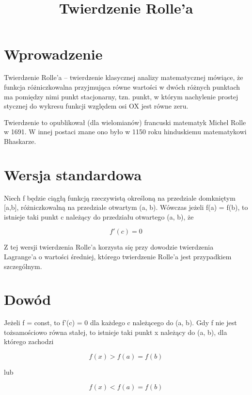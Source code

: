 \documentclass{article}
\begin{document}
\title{Twierdzenie Rolle’a}
\maketitle

\section*{Wprowadzenie}
Twierdzenie Rolle’a – twierdzenie klasycznej analizy matematycznej mówiące, że funkcja różniczkowalna przyjmująca równe wartości w dwóch różnych punktach ma pomiędzy nimi punkt stacjonarny, tzn. punkt, w którym nachylenie prostej stycznej do wykresu funkcji względem osi OX jest równe zeru.

Twierdzenie to opublikował (dla wielomianów) francuski matematyk Michel Rolle w 1691. W innej postaci znane ono było w 1150 roku hinduskiemu matematykowi Bhaskarze. 

\section*{Wersja standardowa}

Niech f będzie ciągłą funkcją rzeczywistą określoną na przedziale domkniętym [a,b], różniczkowalną na przedziale otwartym (a, b). Wówczas jeżeli f(a) = f(b), to istnieje taki punkt c należący do przedziału otwartego (a, b), że 

\begin{equation}
	f'(c)=0
\end{equation}

Z tej wersji twierdzenia Rolle’a korzysta się przy dowodzie twierdzenia Lagrange’a o wartości średniej, którego twierdzenie Rolle’a jest przypadkiem szczególnym. 

\section*{Dowód}
Jeżeli f = const, to f'(c) = 0 dla każdego c należącego do (a, b). Gdy f nie jest tożsamościowo równa stałej, to istnieje taki punkt x należący do (a, b), dla którego zachodzi 

\begin{displaymath}
	f(x) > f(a) = f(b)
\end{displaymath}

lub

\begin{equation*}
	f(x) < f(a) = f(b)
\end{equation*}
\end{document}
